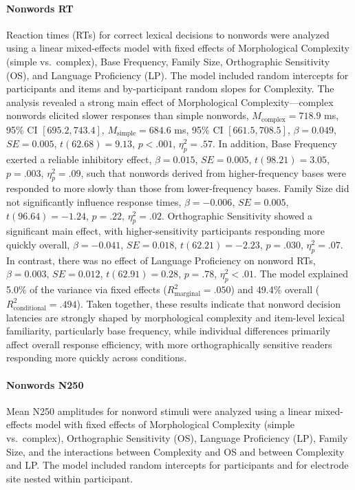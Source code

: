 \documentclass[utf8]{FrontiersinHarvard} %
\begin{document}
\paragraph*{Nonwords RT}
Reaction times (RTs) for correct lexical decisions to nonwords were analyzed using a linear mixed-effects model with fixed effects of Morphological Complexity (simple vs.\ complex), Base Frequency, Family Size, Orthographic Sensitivity (OS), and Language Proficiency (LP). The model included random intercepts for participants and items and by-participant random slopes for Complexity. The analysis revealed a strong main effect of Morphological Complexity—complex nonwords elicited slower responses than simple nonwords, $M_{\mathrm{complex}} = 718.9$ ms, 95\% CI $[695.2, 743.4]$, $M_{\mathrm{simple}} = 684.6$ ms, 95\% CI $[661.5, 708.5]$, $\beta = 0.049$, $SE = 0.005$, $t(62.68) = 9.13$, $p < .001$, $\eta^2_p = .57$. In addition, Base Frequency exerted a reliable inhibitory effect, $\beta = 0.015$, $SE = 0.005$, $t(98.21) = 3.05$, $p = .003$, $\eta^2_p = .09$, such that nonwords derived from higher-frequency bases were responded to more slowly than those from lower-frequency bases. Family Size did not significantly influence response times, $\beta = -0.006$, $SE = 0.005$, $t(96.64) = -1.24$, $p = .22$, $\eta^2_p = .02$. Orthographic Sensitivity showed a significant main effect, with higher-sensitivity participants responding more quickly overall, $\beta = -0.041$, $SE = 0.018$, $t(62.21) = -2.23$, $p = .030$, $\eta^2_p = .07$. In contrast, there was no effect of Language Proficiency on nonword RTs, $\beta = 0.003$, $SE = 0.012$, $t(62.91) = 0.28$, $p = .78$, $\eta^2_p < .01$. The model explained 5.0\% of the variance via fixed effects ($R^2_{\mathrm{marginal}} = .050$) and 49.4\% overall ($R^2_{\mathrm{conditional}} = .494$). Taken together, these results indicate that nonword decision latencies are strongly shaped by morphological complexity and item-level lexical familiarity, particularly base frequency, while individual differences primarily affect overall response efficiency, with more orthographically sensitive readers responding more quickly across conditions.


\paragraph*{Nonwords N250}
Mean N250 amplitudes for nonword stimuli were analyzed using a linear mixed-effects model with fixed effects of Morphological Complexity (simple vs.\ complex), Orthographic Sensitivity (OS), Language Proficiency (LP), Family Size, and the interactions between Complexity and OS and between Complexity and LP. The model included random intercepts for participants and for electrode site nested within participant.
\end{document}
